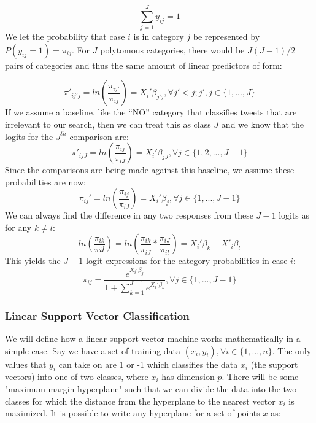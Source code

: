 \documentclass[titlepage, 12pt]{article}
\begin{document}
\begin{equation}
    \sum_{j=1}^{J} y_{ij} =1
\end{equation}
We let the probability that case $i$ is in category $j$ be represented by $P(y_{ij} = 1) = \pi_{ij}$. For $J$ polytomous categories, there would be $J(J-1)/2$ pairs of categories and thus the same amount of linear predictors of form:

\begin{equation}
    \pi'_{ij'j} = ln(\frac{\pi_{ij'}}{\pi_{ij}}) = X_i'\beta_{j'j}, \forall j'<j; j',j \in \{1,..., J\} 
\end{equation}
If we assume a baseline, like the ``NO'' category that classifies tweets that are irrelevant to our search, then we can treat this as class $J$ and we know that the logits for the $J^{th}$ comparison are:
\begin{equation}
    \pi'_{ijJ} = ln(\frac{\pi_{ij}}{\pi_{iJ}}) = X_i'\beta_{jJ}, \forall j \in \{1,2,...,J-1\}
\end{equation}
Since the comparisons are being made against this baseline, we assume these probabilities are now:
\begin{equation}
    \pi_{ij}' = ln(\frac{\pi_{ij}}{\pi_{iJ}}) = X_i'\beta_j, \forall j \in \{1, ..., J-1\}
\end{equation}
We can always find the difference in any two responses from these $J-1$ logits as for any $k \neq l$:
\begin{equation}
    ln(\frac{\pi_{ik}}{\pi{il}}) = ln(\frac{\pi_{ik}}{\pi_{iJ}} * \frac{\pi_{iJ}}{\pi_{il}}) = X_i'\beta_k - X'_i\beta_l
\end{equation}
This yields the $J-1$ logit expressions for the category probabilities in case $i$:
\begin{equation}
    \pi_{ij} = \frac{e^{X_i'\beta_j}}{1 + \sum_{k=1}^{J-1} e^{X_i'\beta_k}}, \forall j \in \{1, ..., J-1\}
\end{equation}
\citep{alsm.2005}

\subsubsection{Linear Support Vector Classification}
\hspace{0.5 cm}We will define how a linear support vector machine works mathematically in a simple case. Say we have a set of training data $(x_i, y_i), \forall i \in\{1,...,n\}$. The only values that $y_i$ can take on are 1 or -1 which classifies the data $x_i$ (the support vectors) into one of two classes, where $x_i$ has dimension $p$. There will be some "maximum margin hyperplane" such that we can divide the data into the two classes for which the distance from the hyperplane to the nearest vector $x_i$ is maximized. It is possible to write any hyperplane for a set of points $x$ as:
\end{document}
